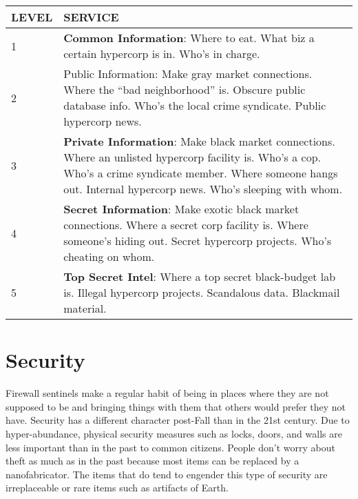 \begin{table}  \begin{tabularx}{\hline}{|l|X|} \hline

LEVEL &SERVICE \\ \hline

1 &\textbf{Common Information}: Where to eat. What biz a certain hypercorp is in. Who’s in charge. \\ \hline

2 &Public Information: Make gray market connections. Where the “bad neighborhood” is. Obscure public database info. Who’s the local crime syndicate. Public hypercorp news. \\ \hline

3 &\textbf{Private Information}: Make black market connections. Where an unlisted hypercorp facility is. Who’s a cop. Who’s a crime syndicate member. Where someone hangs out. Internal hypercorp news. Who’s sleeping with whom. \\ \hline

4 &\textbf{Secret Information}: Make exotic black market connections. Where a secret corp facility is. Where someone’s hiding out. Secret hypercorp projects. Who’s cheating on whom. \\ \hline

5 &\textbf{Top Secret Intel}: Where a top secret black-budget lab is. Illegal hypercorp projects. Scandalous data. Blackmail material. \\ \hline

\end{tabularx} \end{table} 







\section{Security} 

Firewall sentinels make a regular habit of being in places where they are not supposed to be and bringing things with them that others would prefer they not have. Security has a different character post-Fall than in the 21st century. Due to hyper-abundance, physical security measures such as locks, doors, and walls are less important than in the past to common citizens. People don't worry about theft as much as in the past because most items can be replaced by a nanofabricator. The items that do tend to engender this type of security are irreplaceable or rare items such as artifacts of Earth. 

